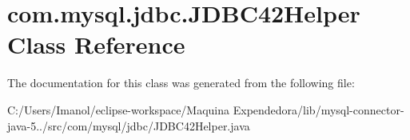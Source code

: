 \hypertarget{classcom_1_1mysql_1_1jdbc_1_1_j_d_b_c42_helper}{}\section{com.\+mysql.\+jdbc.\+J\+D\+B\+C42\+Helper Class Reference}
\label{classcom_1_1mysql_1_1jdbc_1_1_j_d_b_c42_helper}


The documentation for this class was generated from the following file\+:\begin{DoxyCompactItemize}
\item 
C\+:/\+Users/\+Imanol/eclipse-\/workspace/\+Maquina Expendedora/lib/mysql-\/connector-\/java-\/5../src/com/mysql/jdbc/J\+D\+B\+C42\+Helper.\+java\end{DoxyCompactItemize}
